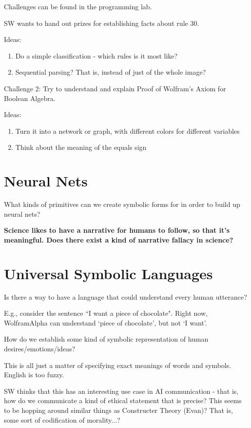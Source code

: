 \documentclass[11pt]{article}
\theoremstyle{definition}
\begin{document}
Challenges can be found in the programming lab.

SW wants to hand out prizes for establishing facts about rule 30.

Ideas:
\begin{enumerate}
\item Do a simple classification - which rules is it most like?
\item Sequential parsing? That is, instead of just of the whole image?
\end{enumerate}

Challenge 2: Try to understand and explain Proof of Wolfram's Axiom for Boolean Algebra.

Ideas:
\begin{enumerate}
\item Turn it into a network or graph, with different colors for different variables
\item Think about the meaning of the equals sign
\end{enumerate}

\section{Neural Nets}

What kinds of primitives can we create symbolic forms for in order to build up neural nets?


\textbf{Science likes to have a narrative for humans to follow, so that it's meaningful. Does there exist a kind of narrative fallacy in science?}

\section{Universal Symbolic Languages}

Is there a way to have a language that could understand every human utterance? 

E.g., consider the sentence ``I want a piece of chocolate". Right now, WolframAlpha can understand `piece of chocolate', but not `I want'. 

How do we establish some kind of symbolic representation of human desires/emotions/ideas?

This is all just a matter of specifying exact meanings of words and symbols. English is too fuzzy. 

SW thinks that this has an interesting use case in AI communication - that is, how do we communicate a kind of ethical statement that is precise? This seems to be hopping around similar things as Constructer Theory (Evan)? That is, some sort of codification of morality...?
\end{document}
